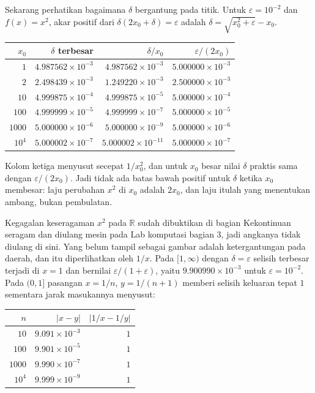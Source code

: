 Sekarang perhatikan bagaimana $\delta$ bergantung pada titik. Untuk
$\varepsilon=10^{-2}$ dan $f(x)=x^{2}$, akar positif dari $\delta(2x_{0}+\delta)=\varepsilon$
adalah $\delta=\sqrt{x_{0}^{2}+\varepsilon}-x_{0}$.

\begin{center}
\small
\begin{tabular}{rrrr}
\hline
$x_{0}$ & $\delta$ terbesar & $\delta/x_{0}$ & $\varepsilon/(2x_{0})$ \\
\hline
$1$ & $4.987562\times10^{-3}$ & $4.987562\times10^{-3}$ & $5.000000\times10^{-3}$ \\
$2$ & $2.498439\times10^{-3}$ & $1.249220\times10^{-3}$ & $2.500000\times10^{-3}$ \\
$10$ & $4.999875\times10^{-4}$ & $4.999875\times10^{-5}$ & $5.000000\times10^{-4}$ \\
$100$ & $4.999999\times10^{-5}$ & $4.999999\times10^{-7}$ & $5.000000\times10^{-5}$ \\
$1000$ & $5.000000\times10^{-6}$ & $5.000000\times10^{-9}$ & $5.000000\times10^{-6}$ \\
$10^{4}$ & $5.000002\times10^{-7}$ & $5.000002\times10^{-11}$ & $5.000000\times10^{-7}$ \\
\hline
\end{tabular}
\end{center}

Kolom ketiga menyusut secepat $1/x_{0}^{2}$, dan untuk $x_{0}$ besar nilai $\delta$
praktis sama dengan $\varepsilon/(2x_{0})$. Jadi tidak ada batas bawah positif untuk
$\delta$ ketika $x_{0}$ membesar: laju perubahan $x^{2}$ di $x_{0}$ adalah $2x_{0}$, dan
laju itulah yang menentukan ambang, bukan pembulatan.

Kegagalan keseragaman $x^{2}$ pada $\mathbb{R}$ sudah dibuktikan di bagian Kekontinuan
seragam dan diulang mesin pada Lab komputasi bagian 3, jadi angkanya tidak diulang di
sini. Yang belum tampil sebagai gambar adalah ketergantungan pada daerah, dan itu
diperlihatkan oleh $1/x$. Pada $[1,\infty)$ dengan $\delta=\varepsilon$ selisih
terbesar terjadi di $x=1$ dan bernilai $\varepsilon/(1+\varepsilon)$, yaitu
$9.900990\times10^{-3}$ untuk $\varepsilon=10^{-2}$. Pada $(0,1]$ pasangan $x=1/n$,
$y=1/(n+1)$ memberi selisih keluaran tepat $1$ sementara jarak masukannya menyusut:

\begin{center}
\small
\begin{tabular}{rrr}
\hline
$n$ & $|x-y|$ & $|1/x-1/y|$ \\
\hline
$10$ & $9.091\times10^{-3}$ & $1$ \\
$100$ & $9.901\times10^{-5}$ & $1$ \\
$1000$ & $9.990\times10^{-7}$ & $1$ \\
$10^{4}$ & $9.999\times10^{-9}$ & $1$ \\
\hline
\end{tabular}
\end{center}

